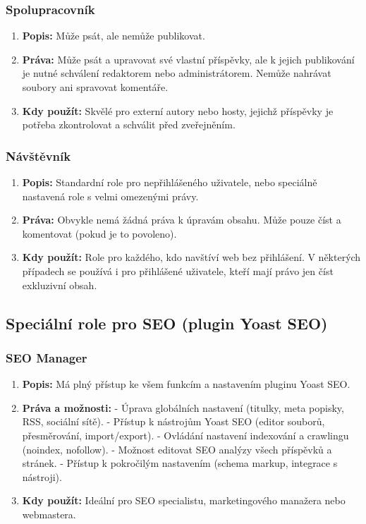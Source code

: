 \documentclass[12pt,a4paper]{article}
\begin{document}
	
	\subsubsection*{Spolupracovník}
	\begin{enumerate}
		\item \textbf{Popis:} Může psát, ale nemůže publikovat.
		\item \textbf{Práva:} Může psát a upravovat své vlastní příspěvky, ale k jejich publikování je nutné schválení redaktorem nebo administrátorem. Nemůže nahrávat soubory ani spravovat komentáře.
		\item \textbf{Kdy použít:} Skvělé pro externí autory nebo hosty, jejichž příspěvky je potřeba zkontrolovat a schválit před zveřejněním.
	\end{enumerate}
	
	\subsubsection*{Návštěvník}
	\begin{enumerate}
		\item \textbf{Popis:} Standardní role pro nepřihlášeného uživatele, nebo speciálně nastavená role s velmi omezenými právy.
		\item \textbf{Práva:} Obvykle nemá žádná práva k úpravám obsahu. Může pouze číst a komentovat (pokud je to povoleno).
		\item \textbf{Kdy použít:} Role pro každého, kdo navštíví web bez přihlášení. V některých případech se používá i pro přihlášené uživatele, kteří mají právo jen číst exkluzivní obsah.
	\end{enumerate}
	
	\subsection*{Speciální role pro SEO (plugin Yoast SEO)}
	
	\subsubsection*{SEO Manager}
	\begin{enumerate}
		\item \textbf{Popis:} Má plný přístup ke všem funkcím a nastavením pluginu Yoast SEO.
		\item \textbf{Práva a možnosti:}  
		- Úprava globálních nastavení (titulky, meta popisky, RSS, sociální sítě).  
		- Přístup k nástrojům Yoast SEO (editor souborů, přesměrování, import/export).  
		- Ovládání nastavení indexování a crawlingu (noindex, nofollow).  
		- Možnost editovat SEO analýzy všech příspěvků a stránek.  
		- Přístup k pokročilým nastavením (schema markup, integrace s nástroji).
		\item \textbf{Kdy použít:} Ideální pro SEO specialistu, marketingového manažera nebo webmastera.
	\end{enumerate}
	
\end{document}
